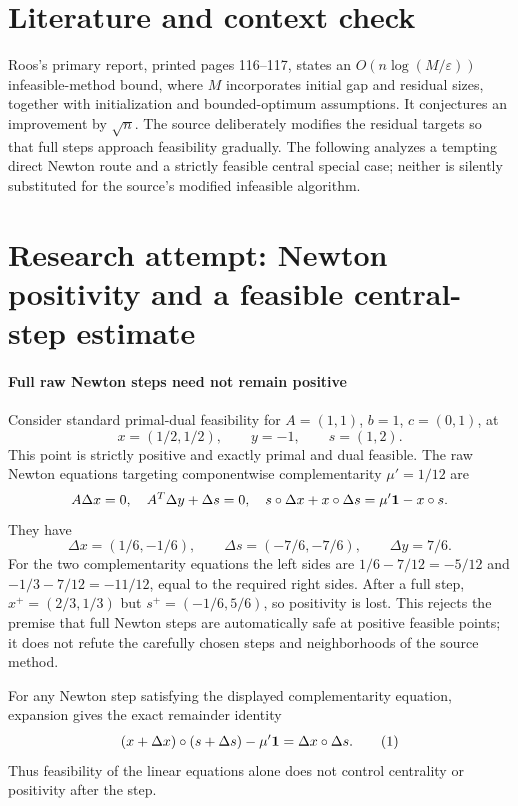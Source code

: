 \documentclass[11pt]{article}
\begin{document}
\section{Literature and context check}
Roos's primary report, printed pages 116--117, states an $O(n\log(M/\varepsilon))$ infeasible-method bound, where $M$ incorporates initial gap and residual sizes, together with initialization and bounded-optimum assumptions. It conjectures an improvement by $\sqrt n$. The source deliberately modifies the residual targets so that full steps approach feasibility gradually. The following analyzes a tempting direct Newton route and a strictly feasible central special case; neither is silently substituted for the source's modified infeasible algorithm.
\section{Research attempt: Newton positivity and a feasible central-step estimate}

\paragraph{Full raw Newton steps need not remain positive}
Consider standard primal-dual feasibility for $A=(1,1)$, $b=1$, $c=(0,1)$, at
\[
 x=(1/2,1/2),\qquad y=-1,\qquad s=(1,2).
\]
This point is strictly positive and exactly primal and dual feasible. The raw Newton equations targeting componentwise complementarity $\mu'=1/12$ are
\[
 A\Delta x=0,\quad A^T\Delta y+\Delta s=0,\quad
 s\circ\Delta x+x\circ\Delta s=\mu'{\bf1}-x\circ s.
\]
They have
\[
 \Delta x=(1/6,-1/6),\qquad \Delta s=(-7/6,-7/6),\qquad \Delta y=7/6.
\]
For the two complementarity equations the left sides are $1/6-7/12=-5/12$ and $-1/3-7/12=-11/12$, equal to the required right sides. After a full step, $x^+=(2/3,1/3)$ but $s^+=(-1/6,5/6)$, so positivity is lost. This rejects the premise that full Newton steps are automatically safe at positive feasible points; it does not refute the carefully chosen steps and neighborhoods of the source method.

For any Newton step satisfying the displayed complementarity equation, expansion gives the exact remainder identity
\[
 (x+\Delta x)\circ(s+\Delta s)-\mu'{\bf1}
   =\Delta x\circ\Delta s.
 \tag{1}
\]
Thus feasibility of the linear equations alone does not control centrality or positivity after the step.
\end{document}
